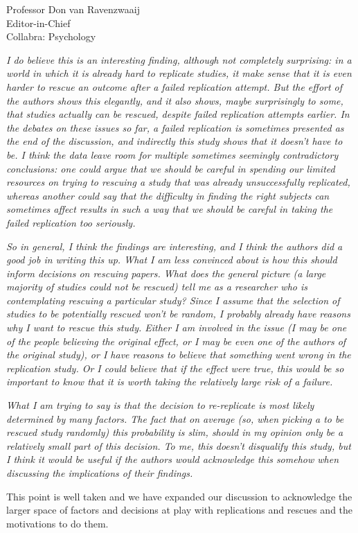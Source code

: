 \documentclass{stanfordletter}
\newcommand{\theysaid}[1]{\begin{leftbar} \noindent 
		\textsl{ #1}\end{leftbar}}
\begin{document}
\begin{letter}{Professor Don van Ravenzwaaij \\ Editor-in-Chief \\ Collabra: Psychology }
		\theysaid{I do believe this is an interesting finding, although not completely surprising: in a world in which it is already hard to replicate studies, it make sense that it is even harder to rescue an outcome after a failed replication attempt. But the effort of the authors shows this elegantly, and it also shows, maybe surprisingly to some, that studies actually can be rescued, despite failed replication attempts earlier. In the debates on these issues so far, a failed replication is sometimes presented as the end of the discussion, and indirectly this study shows that it doesn’t have to be. I think the data leave room for multiple sometimes seemingly contradictory conclusions: one could argue that we should be careful in spending our limited resources on trying to rescuing a study that was already unsuccessfully replicated, whereas another could say that the difficulty in finding the right subjects can sometimes affect results in such a way that we should be careful in taking the failed replication too seriously.}
		
		
		\theysaid{So in general, I think the findings are interesting, and I think the authors did a good job in writing this up. What I am less convinced about is how this should inform decisions on rescuing papers. What does the general picture (a large majority of studies could not be rescued) tell me as a researcher who is contemplating rescuing a particular study? Since I assume that the selection of studies to be potentially rescued won’t be random, I probably already have reasons why I want to rescue this study. Either I am involved in the issue (I may be one of the people believing the original effect, or I may be even one of the authors of the original study), or I have reasons to believe that something went wrong in the replication study. Or I could believe that if the effect were true, this would be so important to know that it is worth taking the relatively large risk of a failure.}
		
		\theysaid{What I am trying to say is that the decision to re-replicate is most likely determined by many factors. The fact that on average (so, when picking a to be rescued study randomly) this probability is slim, should in my opinion only be a relatively small part of this decision. To me, this doesn’t disqualify this study, but I think it would be useful if the authors would acknowledge this somehow when discussing the implications of their findings.}
		
		This point is well taken and we have expanded our discussion to acknowledge the larger space of factors and decisions at play with replications and rescues and the motivations to do them. 
		

\end{letter}
\end{document}
